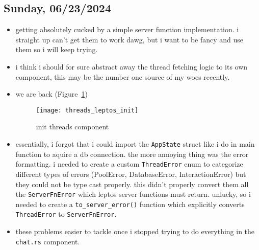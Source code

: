\subsection*{Sunday, 06/23/2024}
\begin{itemize}
    \item getting absolutely cucked by a simple server function implementation.
        i straight up can't get them to work dawg, but i want to be fancy and
        use them so i will keep trying.
    \item i think i should for sure abstract away the thread fetching logic to
        its own component, this may be the number one source of my woes
        recently.
    \item we are back (Figure~\ref{fig:threads_leptos_init})
        \begin{figure}[ht]
            \centering
            \texttt{[image: threads\_leptos\_init]}
            \captionsetup{labelfont=bf, textfont=it}
            \caption{init threads component}
            \label{fig:threads_leptos_init}
        \end{figure}
    \item essentially, i forgot that i could import the \texttt{AppState} 
        struct like i do in main function to aquire a db connection. the more 
        annoying thing was the error formatting. i needed to create a custom 
        \texttt{ThreadError} enum to
        categorize different types of errors (PoolError, DatabaseError,
        InteractionError) but they could not be type cast properly. this didn't
        properly convert them all the \texttt{ServerFnError} which leptos server
        functions must return. unlucky, so i needed to create a
        \texttt{to_server_error()} function which explicitly converts
        \texttt{ThreadError} to \texttt{ServerFnError}.
    \item these problems easier to tackle once i stopped trying to do everything
        in the \texttt{chat.rs} component.
\end{itemize}

